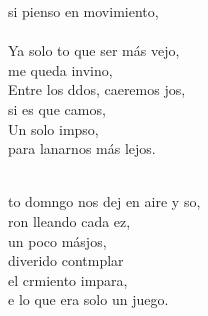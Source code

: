 \begin{cancion}
si pienso en movimiento,\\
\jump\\
	Ya solo to que ser más vejo, \\
	me queda invino,\\
	Entre los ddos, caeremos jos, \\
	si es que camos,\\
	Un solo impso, \\
	para lanarnos más lejos.\\\jump\\
	\begin{chorus}%
	to domngo nos dej en aire y so, \\
	ron lleando cada ez, \\
	un poco másjos,\\
	 diverido contmplar  \\
	el crmiento impara,\\
	e lo que era solo un juego.\\
	\end{chorus}%
	\jump\\
	   \\
\end{cancion}%

